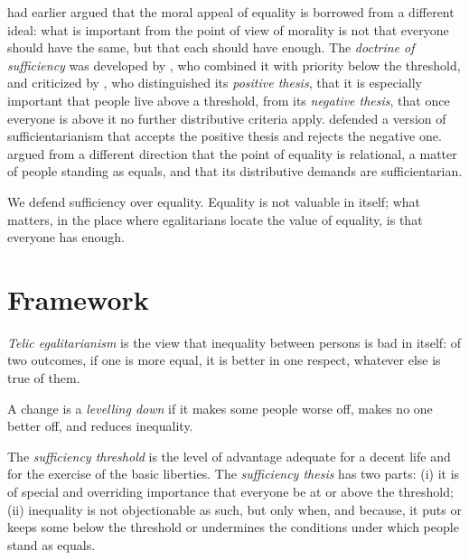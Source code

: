 \documentclass{situationist-preprint}
\begin{document}
\citet{Frankfurt1987} had earlier argued that the moral appeal of equality is borrowed from a different ideal: what is important from the point of view of morality is not that everyone should have the same, but that each should have enough. The \emph{doctrine of sufficiency} was developed by \citet{Crisp2003}, who combined it with priority below the threshold, and criticized by \citet{Casal2007}, who distinguished its \emph{positive thesis}, that it is especially important that people live above a threshold, from its \emph{negative thesis}, that once everyone is above it no further distributive criteria apply. \citet{Shields2012} defended a version of sufficientarianism that accepts the positive thesis and rejects the negative one. \citet{Anderson1999} argued from a different direction that the point of equality is relational, a matter of people standing as equals, and that its distributive demands are sufficientarian.

We defend sufficiency over equality. Equality is not valuable in itself; what matters, in the place where egalitarians locate the value of equality, is that everyone has enough.

\section{Framework}

\begin{definition}\label{d:telic}
\emph{Telic egalitarianism} is the view that inequality between persons is bad in itself: of two outcomes, if one is more equal, it is better in one respect, whatever else is true of them.
\end{definition}

\begin{definition}\label{d:level}
A change is a \emph{levelling down} if it makes some people worse off, makes no one better off, and reduces inequality.
\end{definition}

\begin{definition}\label{d:threshold}
The \emph{sufficiency threshold} is the level of advantage adequate for a decent life and for the exercise of the basic liberties. The \emph{sufficiency thesis} has two parts: (i) it is of special and overriding importance that everyone be at or above the threshold; (ii) inequality is not objectionable as such, but only when, and because, it puts or keeps some below the threshold or undermines the conditions under which people stand as equals.
\end{definition}
\end{document}
